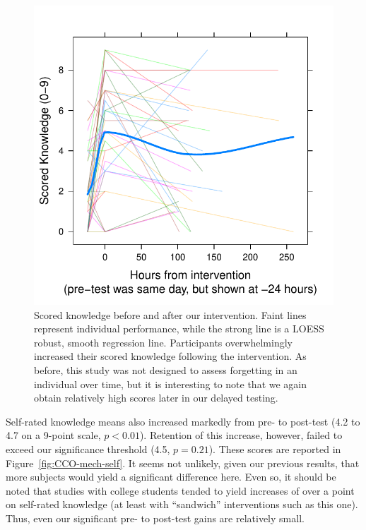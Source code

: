 \begin{figure}
    \centering
    \includegraphics{CCO-mech-scored.pdf}
    \caption{Scored knowledge before and after our intervention. Faint lines
        represent individual performance, while the strong line is a LOESS
        robust, smooth regression line. Participants overwhelmingly increased
        their scored knowledge following the intervention. As before, this study was
        not designed to assess forgetting in an individual over time, but it is
        interesting to note that we again obtain relatively high scores later in
        our delayed testing.}
    \label{fig:CCO-mech-scored}
\end{figure}

Self-rated knowledge means also increased markedly from pre- to post-test (4.2
to 4.7 on a 9-point scale, $p<0.01$). Retention of this increase, however,
failed to exceed our significance threshold (4.5, $p=0.21$). These scores are
reported in Figure~\ref{fig:CCO-mech-self}. It seems not unlikely, given our
previous results, that more subjects would yield a significant difference here.
Even so, it should be noted that studies with college students tended to yield
increases of over a point on self-rated knowledge (at least with “sandwich”
interventions such as this one). Thus, even our significant pre- to post-test
gains are relatively small.

